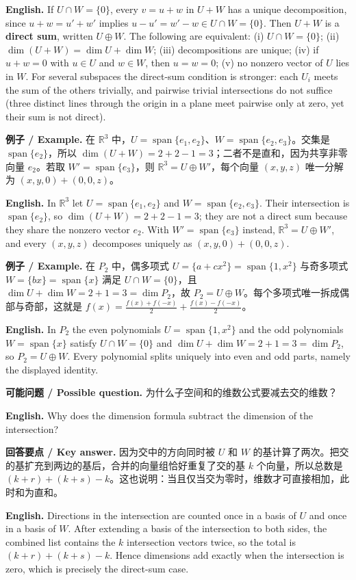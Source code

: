 \documentclass[UTF8,11pt,a4paper]{ctexart}
\newcommand{\EN}[1]{\par\noindent\textbf{English.} #1\par}
\newcommand{\EX}[2]{\par\noindent\textbf{例子 / Example.} #1\par\EN{#2}}
\newcommand{\ASK}[4]{\par\noindent\textbf{可能问题 / Possible question.} #1\par\EN{#2}\noindent\textbf{回答要点 / Key answer.} #3\par\EN{#4}\medskip}
\begin{document}
\EN{If $U\cap W=\{0\}$, every $v=u+w$ in $U+W$ has a unique decomposition, since $u+w=u'+w'$ implies $u-u'=w'-w\in U\cap W=\{0\}$. Then $U+W$ is a \textbf{direct sum}, written $U\oplus W$. The following are equivalent: (i) $U\cap W=\{0\}$; (ii) $\dim(U+W)=\dim U+\dim W$; (iii) decompositions are unique; (iv) if $u+w=0$ with $u\in U$ and $w\in W$, then $u=w=0$; (v) no nonzero vector of $U$ lies in $W$. For several subspaces the direct-sum condition is stronger: each $U_i$ meets the sum of the others trivially, and pairwise trivial intersections do not suffice (three distinct lines through the origin in a plane meet pairwise only at zero, yet their sum is not direct).}
\EX{在 $\mathbb R^3$ 中，$U=\operatorname{span}\{e_1,e_2\}$、$W=\operatorname{span}\{e_2,e_3\}$。交集是 $\operatorname{span}\{e_2\}$，所以 $\dim(U+W)=2+2-1=3$；二者不是直和，因为共享非零向量 $e_2$。若取 $W'=\operatorname{span}\{e_3\}$，则 $\mathbb R^3=U\oplus W'$，每个向量 $(x,y,z)$ 唯一分解为 $(x,y,0)+(0,0,z)$。}{In $\mathbb R^3$ let $U=\operatorname{span}\{e_1,e_2\}$ and $W=\operatorname{span}\{e_2,e_3\}$. Their intersection is $\operatorname{span}\{e_2\}$, so $\dim(U+W)=2+2-1=3$; they are not a direct sum because they share the nonzero vector $e_2$. With $W'=\operatorname{span}\{e_3\}$ instead, $\mathbb R^3=U\oplus W'$, and every $(x,y,z)$ decomposes uniquely as $(x,y,0)+(0,0,z)$.}
\EX{在 $P_2$ 中，偶多项式 $U=\{a+cx^2\}=\operatorname{span}\{1,x^2\}$ 与奇多项式 $W=\{bx\}=\operatorname{span}\{x\}$ 满足 $U\cap W=\{0\}$，且 $\dim U+\dim W=2+1=3=\dim P_2$，故 $P_2=U\oplus W$。每个多项式唯一拆成偶部与奇部，这就是 $f(x)=\frac{f(x)+f(-x)}2+\frac{f(x)-f(-x)}2$。}{In $P_2$ the even polynomials $U=\operatorname{span}\{1,x^2\}$ and the odd polynomials $W=\operatorname{span}\{x\}$ satisfy $U\cap W=\{0\}$ and $\dim U+\dim W=2+1=3=\dim P_2$, so $P_2=U\oplus W$. Every polynomial splits uniquely into even and odd parts, namely the displayed identity.}
\ASK{为什么子空间和的维数公式要减去交的维数？}{Why does the dimension formula subtract the dimension of the intersection?}{因为交中的方向同时被 $U$ 和 $W$ 的基计算了两次。把交的基扩充到两边的基后，合并的向量组恰好重复了交的基 $k$ 个向量，所以总数是 $(k+r)+(k+s)-k$。这也说明：当且仅当交为零时，维数才可直接相加，此时和为直和。}{Directions in the intersection are counted once in a basis of $U$ and once in a basis of $W$. After extending a basis of the intersection to both sides, the combined list contains the $k$ intersection vectors twice, so the total is $(k+r)+(k+s)-k$. Hence dimensions add exactly when the intersection is zero, which is precisely the direct-sum case.}
\end{document}
